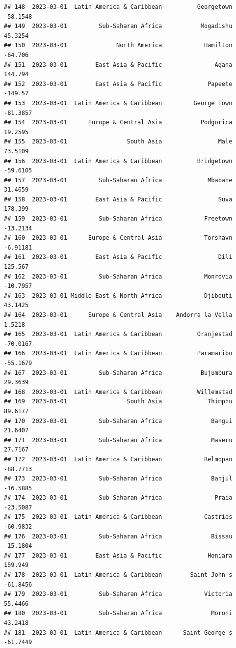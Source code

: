 \documentclass[
]{article}
\begin{document}
\begin{verbatim}
## 148  2023-03-01  Latin America & Caribbean          Georgetown   -58.1548
## 149  2023-03-01         Sub-Saharan Africa           Mogadishu    45.3254
## 150  2023-03-01              North America            Hamilton    -64.706
## 151  2023-03-01        East Asia & Pacific               Agana    144.794
## 152  2023-03-01        East Asia & Pacific             Papeete    -149.57
## 153  2023-03-01  Latin America & Caribbean         George Town   -81.3857
## 154  2023-03-01      Europe & Central Asia           Podgorica    19.2595
## 155  2023-03-01                 South Asia                Male    73.5109
## 156  2023-03-01  Latin America & Caribbean          Bridgetown   -59.6105
## 157  2023-03-01         Sub-Saharan Africa             Mbabane    31.4659
## 158  2023-03-01        East Asia & Pacific                Suva    178.399
## 159  2023-03-01         Sub-Saharan Africa            Freetown   -13.2134
## 160  2023-03-01      Europe & Central Asia            Torshavn   -6.91181
## 161  2023-03-01        East Asia & Pacific                Dili    125.567
## 162  2023-03-01         Sub-Saharan Africa            Monrovia   -10.7957
## 163  2023-03-01 Middle East & North Africa            Djibouti    43.1425
## 164  2023-03-01      Europe & Central Asia    Andorra la Vella     1.5218
## 165  2023-03-01  Latin America & Caribbean          Oranjestad   -70.0167
## 166  2023-03-01  Latin America & Caribbean          Paramaribo   -55.1679
## 167  2023-03-01         Sub-Saharan Africa           Bujumbura    29.3639
## 168  2023-03-01  Latin America & Caribbean          Willemstad           
## 169  2023-03-01                 South Asia             Thimphu    89.6177
## 170  2023-03-01         Sub-Saharan Africa              Bangui    21.6407
## 171  2023-03-01         Sub-Saharan Africa              Maseru    27.7167
## 172  2023-03-01  Latin America & Caribbean            Belmopan   -88.7713
## 173  2023-03-01         Sub-Saharan Africa              Banjul   -16.5885
## 174  2023-03-01         Sub-Saharan Africa               Praia   -23.5087
## 175  2023-03-01  Latin America & Caribbean            Castries   -60.9832
## 176  2023-03-01         Sub-Saharan Africa              Bissau   -15.1804
## 177  2023-03-01        East Asia & Pacific             Honiara    159.949
## 178  2023-03-01  Latin America & Caribbean        Saint John's   -61.8456
## 179  2023-03-01         Sub-Saharan Africa            Victoria    55.4466
## 180  2023-03-01         Sub-Saharan Africa              Moroni    43.2418
## 181  2023-03-01  Latin America & Caribbean      Saint George's   -61.7449

\end{verbatim}
\end{document}
